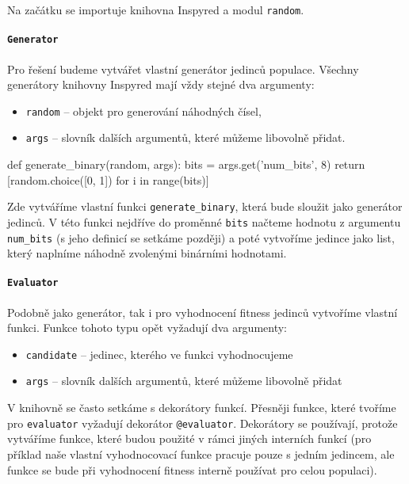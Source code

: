 Na začátku se importuje knihovna Inspyred a modul \texttt{random}.

\paragraph{\texttt{Generator}}
Pro řešení budeme vytvářet vlastní generátor jedinců populace. Všechny
generátory knihovny Inspyred mají vždy stejné dva argumenty:
\begin{itemize}
    \item \texttt{random} -- objekt pro generování náhodných čísel,
    \item \texttt{args} -- slovník dalších argumentů, které můžeme libovolně
        přidat.
\end{itemize}

\begin{code}
def generate_binary(random, args):
    bits = args.get('num_bits', 8)
    return [random.choice([0, 1]) for i in range(bits)]
\end{code}

Zde vytváříme vlastní funkci \texttt{generate\_binary}, která bude sloužit jako
generátor jedinců. V této funkci nejdříve do proměnné \texttt{bits} načteme
hodnotu z argumentu \texttt{num\_bits} (s jeho definicí se setkáme později) a
poté vytvoříme jedince jako list, který naplníme náhodně zvolenými binárními
hodnotami.

\paragraph{\texttt{Evaluator}}
Podobně jako generátor, tak i pro vyhodnocení fitness jedinců vytvoříme vlastní
funkci. Funkce tohoto typu opět vyžadují dva argumenty:
\begin{itemize}
    \item \texttt{candidate} -- jedinec, kterého ve funkci vyhodnocujeme
    \item \texttt{args} -- slovník dalších argumentů, které můžeme libovolně
        přidat
\end{itemize}

V knihovně se často setkáme s dekorátory funkcí. Přesněji funkce, které tvoříme
pro \texttt{evaluator} vyžadují dekorátor \texttt{@evaluator}. Dekorátory se
používají, protože vytváříme funkce, které budou použité v rámci jiných
interních funkcí (pro příklad naše vlastní vyhodnocovací funkce pracuje pouze s
jedním jedincem, ale funkce se bude při vyhodnocení fitness interně používat
pro celou populaci).

